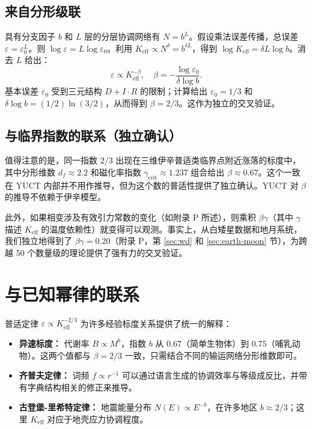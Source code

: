 \documentclass[12pt]{article}
\newcommand{\Keff}{K_{\mathrm{eff}}}
\newcommand{\eps}{\varepsilon}
\begin{document}
	\subsection*{来自分形级联}
	具有分支因子 \(b\) 和 \(L\) 层的分层协调网络有 \(N = b^L\)。假设乘法误差传播，总误差 \(\eps = \eps_0^{L}\)。则 \(\log \eps = L \log \eps_0\)。利用 \(\Keff \propto N^{\delta} = b^{\delta L}\)，得到 \(\log \Keff = \delta L \log b\)。消去 \(L\) 给出：
	\[
	\eps \propto \Keff^{-\beta}, \quad \beta = -\frac{\log \eps_0}{\delta \log b}.
	\]
	基本误差 \(\eps_0\) 受到三元结构 \(D+I\!\cdot\!R\) 的限制；计算给出 \(\eps_0 = 1/3\) 和 \(\delta \log b = (1/2)\ln(3/2)\)，从而得到 \(\beta = 2/3\)。这作为独立的交叉验证。
	
	\subsection*{与临界指数的联系（独立确认）}
	值得注意的是，同一指数 \(2/3\) 出现在三维伊辛普适类临界点附近涨落的标度中，其中分形维数 \(d_f \approx 2.2\) 和磁化率指数 \(\gamma_{\mathrm{crit}} \approx 1.237\) 组合给出 \(\beta \approx 0.67\)。这个一致在 YUCT 内部并不用作推导，但为这个数的普适性提供了独立确认。YUCT 对 \(\beta\) 的推导不依赖于伊辛模型。
	
	此外，如果相变涉及有效引力常数的变化（如附录 P 所述），则乘积 \(\beta\gamma\)（其中 \(\gamma\) 描述 \(K_{\mathrm{eff}}\) 的温度依赖性）就变得可以观测。事实上，从白矮星数据和地月系统，我们独立地得到了 \(\beta\gamma = 0.20\)（附录 P，第 \ref{sec:wd} 和 \ref{sec:earth-moon} 节），为跨越 50 个数量级的理论提供了强有力的交叉验证。
	
	\section{与已知幂律的联系}
	\label{sec:connections}
	
	普适定律 \(\eps \propto \Keff^{-2/3}\) 为许多经验标度关系提供了统一的解释：
	
	\begin{itemize}
		\item \textbf{异速标度：} 代谢率 \(B \propto M^{b}\)，指数 \(b\) 从 \(0.67\)（简单生物体）到 \(0.75\)（哺乳动物）。这两个值都与 \(\beta = 2/3\) 一致，只需结合不同的输运网络分形维数即可。
		\item \textbf{齐普夫定律：} 词频 \(f \propto r^{-1}\) 可以通过语言生成的协调效率与等级成反比，并带有字典结构相关的修正来推导。
		\item \textbf{古登堡-里希特定律：} 地震能量分布 \(N(E) \propto E^{-b}\)，在许多地区 \(b \approx 2/3\)；这里 \(\Keff\) 对应于地壳应力协调程度。
	\end{itemize}
	
\end{document}
